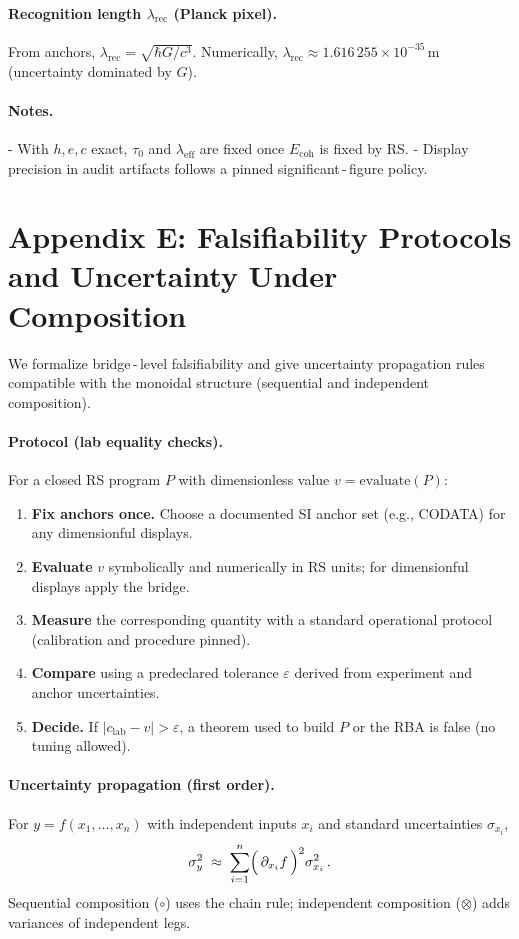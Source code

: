 \documentclass[11pt]{article}
\newcommand{\lamrec}{\lambda_{\mathrm{rec}}}
\newcommand{\tauzero}{\tau_{0}}
\newcommand{\Ecoh}{E_{\mathrm{coh}}}
\theoremstyle{remark}
\begin{document}
\paragraph{Recognition length $\lamrec$ (Planck pixel).}
From anchors, $\lamrec = \sqrt{\hbar G / c^{3}}$. Numerically,
\(\lamrec \approx 1.616\,255\times 10^{-35}\,\mathrm{m}\) (uncertainty dominated by $G$).

\paragraph{Notes.}
- With $h,e,c$ exact, $\tauzero$ and $\lambda_{\mathrm{eff}}$ are fixed once $\Ecoh$ is fixed by RS.
- Display precision in audit artifacts follows a pinned significant\,\mbox{-}\,figure policy.

\bigskip
\section*{Appendix E: Falsifiability Protocols and Uncertainty Under Composition}
We formalize bridge\,\mbox{-}\,level falsifiability and give uncertainty propagation rules compatible with the
monoidal structure (sequential and independent composition).

\paragraph{Protocol (lab equality checks).}
For a closed RS program $P$ with dimensionless value $v = \mathrm{evaluate}(P)$:
\begin{enumerate}
  \item \textbf{Fix anchors once.} Choose a documented SI anchor set (e.g., CODATA) for any dimensionful displays.
  \item \textbf{Evaluate} $v$ symbolically and numerically in RS units; for dimensionful displays apply the bridge.
  \item \textbf{Measure} the corresponding quantity with a standard operational protocol (calibration and procedure pinned).
  \item \textbf{Compare} using a predeclared tolerance $\varepsilon$ derived from experiment and anchor uncertainties.
  \item \textbf{Decide.} If $|c_{\mathrm{lab}} - v| > \varepsilon$, a theorem used to build $P$ or the RBA is false (no tuning allowed).
\end{enumerate}

\paragraph{Uncertainty propagation (first order).}
For $y=f(x_1,\dots,x_n)$ with independent inputs $x_i$ and standard uncertainties $\sigma_{x_i}$,
\[
  \sigma_y^2 \;\approx\; \sum_{i=1}^n \Bigl(\,\partial_{x_i} f\,\Bigr)^2 \sigma_{x_i}^2\,.
\]
Sequential composition ($\circ$) uses the chain rule; independent composition ($\otimes$) adds variances of independent legs.
\end{document}
